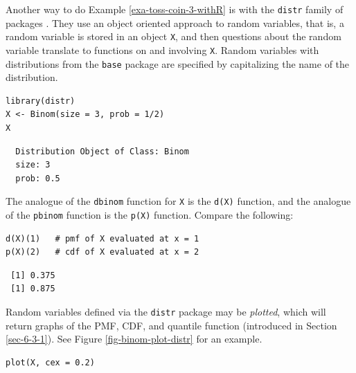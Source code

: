 \documentclass[captions=tableheading]{scrbook}
\begin{document}
\begin{example}
Another way to do Example \ref{exa-toss-coin-3-withR} is with the \texttt{distr} family of packages \cite{Ruckdescheldistr}. They use an object oriented approach to random variables, that is, a random variable is stored in an object \texttt{X}, and then questions about the random variable translate to functions on and involving \texttt{X}. Random variables with distributions from the \texttt{base} package are specified by capitalizing the name of the distribution.


\lstset{language=R}
\begin{lstlisting}
library(distr)
X <- Binom(size = 3, prob = 1/2)
X
\end{lstlisting}

\begin{verbatim}
  Distribution Object of Class: Binom
  size: 3
  prob: 0.5
\end{verbatim}

The analogue of the \texttt{dbinom} function for \texttt{X} is the \texttt{d(X)} function, and the analogue of the \texttt{pbinom} function is the \texttt{p(X)} function. Compare the following:


\lstset{language=R}
\begin{lstlisting}
d(X)(1)   # pmf of X evaluated at x = 1
p(X)(2)   # cdf of X evaluated at x = 2
\end{lstlisting}

\begin{verbatim}
 [1] 0.375
 [1] 0.875
\end{verbatim}

\end{example}

Random variables defined via the \texttt{distr} package may be \emph{plotted}, which will return graphs of the PMF, CDF, and quantile function (introduced in Section \ref{sec-6-3-1}). See Figure \ref{fig-binom-plot-distr} for an example.


\lstset{language=R}
\begin{lstlisting}
plot(X, cex = 0.2)
\end{lstlisting}
\end{document}
